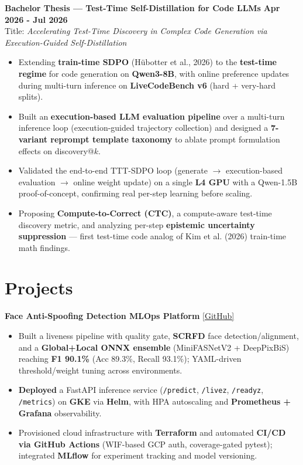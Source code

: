 \documentclass[a4paper,10pt]{article}
\begin{document}
\noindent\textbf{Bachelor Thesis --- Test-Time Self-Distillation for Code LLMs} \hfill \textbf{Apr 2026 - Jul 2026} \\
\quad Title: \textit{Accelerating Test-Time Discovery in Complex Code Generation via Execution-Guided Self-Distillation} \\
\vspace{-0.3em}
\begin{itemize}[leftmargin=1.2em, itemsep=0.05em, parsep=0pt, topsep=0pt]
    \item Extending \textbf{train-time SDPO} (Hübotter et al., 2026) to the \textbf{test-time regime} for code generation on \textbf{Qwen3-8B}, with online preference updates during multi-turn inference on \textbf{LiveCodeBench v6} (hard + very-hard splits).
    \item Built an \textbf{execution-based LLM evaluation pipeline} over a multi-turn inference loop (execution-guided trajectory collection) and designed a \textbf{7-variant reprompt template taxonomy} to ablate prompt formulation effects on discovery@$k$.
    \item Validated the end-to-end TTT-SDPO loop (generate $\rightarrow$ execution-based evaluation $\rightarrow$ online weight update) on a single \textbf{L4 GPU} with a Qwen-1.5B proof-of-concept, confirming real per-step learning before scaling.
    \item Proposing \textbf{Compute-to-Correct (CTC)}, a compute-aware test-time discovery metric, and analyzing per-step \textbf{epistemic uncertainty suppression} — first test-time code analog of Kim et al. (2026) train-time math findings.
\end{itemize}

\section{Projects}

\noindent\textbf{Face Anti-Spoofing Detection MLOps Platform} \hfill \href{https://github.com/theAbyssOfTime2004/face-spoofing-detection}{\color{darkblue}[GitHub]} \\\vspace{-1.1em}

\begin{itemize}[leftmargin=1.2em, itemsep=0.05em, parsep=0pt]
    \item Built a liveness pipeline with quality gate, \textbf{SCRFD} face detection/alignment, and a \textbf{Global+Local ONNX ensemble} (MiniFASNetV2 + DeepPixBiS) reaching \textbf{F1 90.1\%} (Acc 89.3\%, Recall 93.1\%); YAML-driven threshold/weight tuning across environments.
    \item \textbf{Deployed} a FastAPI inference service (\texttt{/predict}, \texttt{/livez}, \texttt{/readyz}, \texttt{/metrics}) on \textbf{GKE} via \textbf{Helm}, with HPA autoscaling and \textbf{Prometheus + Grafana} observability.
    \item Provisioned cloud infrastructure with \textbf{Terraform} and automated \textbf{CI/CD via GitHub Actions} (WIF-based GCP auth, coverage-gated pytest); integrated \textbf{MLflow} for experiment tracking and model versioning.
\end{itemize}
\end{document}
